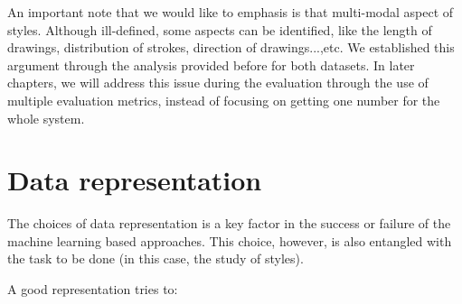\par An important note that we would like to emphasis is that multi-modal aspect of styles. Although ill-defined, some aspects can be identified, like the length of drawings, distribution of strokes, direction of drawings...,etc. We established this argument through the analysis provided before for both datasets. In later chapters, we will address this issue during the evaluation through the use of multiple evaluation metrics, instead of focusing on getting one number for the whole system.

\section{Data representation}\label{sec:data_representation}

  The choices of data representation is a key factor in the success or failure of the machine learning based approaches. This choice, however, is also entangled with the task to be done (in this case, the study of styles).

  A good representation tries to:

